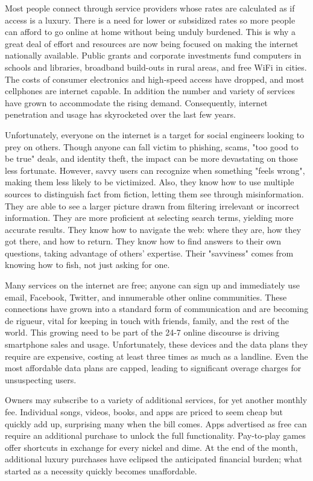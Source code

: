 Most people connect through service providers whose rates are calculated
as if access is a luxury. There is a need for lower or subsidized rates
so more people can afford to go online at home without being unduly
burdened. This is why a great deal of effort and resources are now being
focused on making the internet nationally available. Public grants
and corporate investments fund computers in schools and libraries,
broadband build-outs in rural areas, and free WiFi in cities. The costs
of consumer electronics and high-speed access have dropped, and most
cellphones are internet capable. In addition the number and variety
of services have grown to accommodate the rising demand. Consequently,
internet penetration and usage has skyrocketed over the last few years.



Unfortunately, everyone on the internet is a target for social engineers
looking to prey on others. Though anyone can fall victim to phishing,
scams, "too good to be true" deals, and identity theft, the impact can
be more devastating on those less fortunate. However, savvy users can
recognize when something "feels wrong", making them less likely to be
victimized. Also, they know how to use multiple sources to distinguish
fact from fiction, letting them see through misinformation. They
are able to see a larger picture drawn from filtering irrelevant or
incorrect information. They are more proficient at selecting search
terms, yielding more accurate results. They know how to navigate the
web: where they are, how they got there, and how to return. They know
how to find answers to their own questions, taking advantage of others'
expertise. Their "savviness" comes from knowing how to fish, not just
asking for one.



Many services on the internet are free; anyone can sign up and
immediately use email, Facebook, Twitter, and innumerable other online
communities. These connections have grown into a standard form of
communication and are becoming de rigueur, vital for keeping in touch
with friends, family, and the rest of the world. This growing need to
be part of the 24-7 online discourse is driving smartphone sales and
usage. Unfortunately, these devices and the data plans they require
are expensive, costing at least three times as much as a landline.
Even the most affordable data plans are capped, leading to significant
overage charges for unsuspecting users. 

Owners may subscribe to a variety of additional services, for yet
another monthly fee. Individual songs, videos, books, and apps are
priced to seem cheap but quickly add up, surprising many when the bill
comes. Apps advertised as free can require an additional purchase to
unlock the full functionality. Pay-to-play games offer shortcuts in
exchange for every nickel and dime. At the end of the month, additional
luxury purchases have eclipsed the anticipated financial burden; what
started as a necessity quickly becomes unaffordable.


